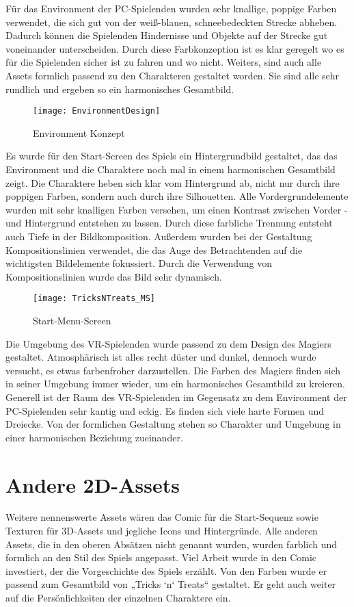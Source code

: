 Für das Environment der PC-Spielenden wurden sehr knallige, poppige Farben verwendet, die sich gut von der weiß-blauen, schneebedeckten Strecke abheben. Dadurch können die Spielenden Hindernisse und Objekte auf der Strecke gut voneinander unterscheiden. Durch diese Farbkonzeption ist es klar geregelt wo es für die Spielenden sicher ist zu fahren und wo nicht. Weiters, sind auch alle Assets formlich passend zu den Charakteren gestaltet worden. Sie sind alle sehr rundlich und ergeben so ein harmonisches Gesamtbild.

\begin{figure}[H]
	\centering
	\texttt{[image: EnvironmentDesign]}
	\caption{Environment Konzept}
\end{figure}

Es wurde für den Start-Screen des Spiels ein Hintergrundbild gestaltet, das das Environment und die Charaktere noch mal in einem harmonischen Gesamtbild zeigt. Die Charaktere heben sich klar vom Hintergrund ab, nicht nur durch ihre poppigen Farben, sondern auch durch ihre Silhouetten. Alle Vordergrundelemente wurden mit sehr knalligen Farben versehen, um einen Kontrast zwischen Vorder -und Hintergrund entstehen zu lassen. Durch diese farbliche Trennung entsteht auch Tiefe in der Bildkomposition. Außerdem wurden bei der Gestaltung Kompositionslinien verwendet, die das Auge des Betrachtenden auf die wichtigsten Bildelemente fokussiert. Durch die Verwendung von Kompositionslinien wurde das Bild sehr dynamisch.

\begin{figure}[H]
	\centering
	\texttt{[image: TricksNTreats\_MS]}
	\caption{Start-Menu-Screen}
\end{figure}

Die Umgebung des VR-Spielenden wurde passend zu dem Design des Magiers gestaltet. Atmosphärisch ist alles recht düster und dunkel, dennoch wurde versucht, es etwas farbenfroher darzustellen. Die Farben des Magiers finden sich in seiner Umgebung immer wieder, um ein harmonisches Gesamtbild zu kreieren. Generell ist der Raum des VR-Spielenden im Gegensatz zu dem Environment der PC-Spielenden sehr kantig und eckig. Es finden sich viele harte Formen und Dreiecke. Von der formlichen Gestaltung stehen so Charakter und Umgebung in einer harmonischen Beziehung zueinander.

\section{Andere 2D-Assets}
Weitere nennenswerte Assets wären das Comic für die Start-Sequenz sowie Texturen für 3D-Assets und jegliche Icons und Hintergründe. Alle anderen Assets, die in den oberen Absätzen nicht genannt wurden, wurden farblich und formlich an den Stil des Spiels angepasst. 
Viel Arbeit wurde in den Comic investiert, der die Vorgeschichte des Spiels erzählt. Von den Farben wurde er passend zum Gesamtbild von „Tricks ‘n‘ Treats“ gestaltet. Er geht auch weiter auf die Persönlichkeiten der einzelnen Charaktere ein.


